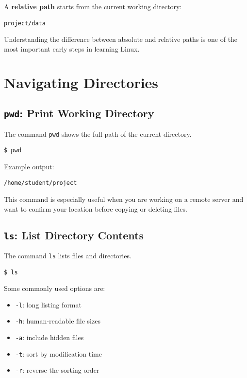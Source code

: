 A \textbf{relative path} starts from the current working directory:

\begin{lstlisting}
project/data
\end{lstlisting}

Understanding the difference between absolute and relative paths is one
of the most important early steps in learning Linux.

\section{Navigating Directories}

\subsection{\texttt{pwd}: Print Working Directory}

The command \texttt{pwd} shows the full path of the current directory.

\begin{lstlisting}
$ pwd
\end{lstlisting}

Example output:

\begin{lstlisting}
/home/student/project
\end{lstlisting}

This command is especially useful when you are working on a remote server
and want to confirm your location before copying or deleting files.

\subsection{\texttt{ls}: List Directory Contents}

The command \texttt{ls} lists files and directories.

\begin{lstlisting}
$ ls
\end{lstlisting}

Some commonly used options are:

\begin{itemize}
\item \texttt{-l}: long listing format
\item \texttt{-h}: human-readable file sizes
\item \texttt{-a}: include hidden files
\item \texttt{-t}: sort by modification time
\item \texttt{-r}: reverse the sorting order
\end{itemize}

